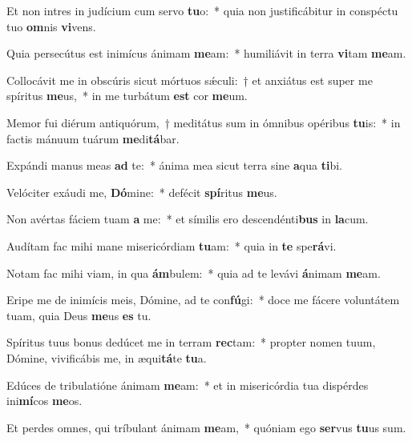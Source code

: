 \item Et non intres in judícium cum servo \textbf{tu}o:~* quia non justificábitur in conspéctu tuo \textbf{om}nis \textbf{vi}vens.
\item Quia persecútus est inimícus ánimam \textbf{me}am:~* humiliávit in terra \textbf{vi}tam \textbf{me}am.
\item Collocávit me in obscúris sicut mórtuos sǽculi:~† et anxiátus est super me spíritus \textbf{me}us,~* in me turbátum \textbf{est} cor \textbf{me}um.
\item Memor fui diérum antiquórum,~† meditátus sum in ómnibus opéribus \textbf{tu}is:~* in factis mánuum tuárum \textbf{me}di\textbf{tá}bar.
\item Expándi manus meas \textbf{ad} te:~* ánima mea sicut terra sine \textbf{a}qua \textbf{ti}bi.
\item Velóciter exáudi me, \textbf{Dó}mine:~* defécit \textbf{spí}ritus \textbf{me}us.
\item Non avértas fáciem tuam \textbf{a} me:~* et símilis ero descendénti\textbf{bus} in \textbf{la}cum.
\item Audítam fac mihi mane misericórdiam \textbf{tu}am:~* quia in \textbf{te} spe\textbf{rá}vi.
\item Notam fac mihi viam, in qua \textbf{ám}bulem:~* quia ad te levávi \textbf{á}nimam \textbf{me}am.
\item Eripe me de inimícis meis, Dómine, ad te con\textbf{fú}gi:~* doce me fácere voluntátem tuam, quia Deus \textbf{me}us \textbf{es} tu.
\item Spíritus tuus bonus dedúcet me in terram \textbf{rec}tam:~* propter nomen tuum, Dómine, vivificábis me, in æqui\textbf{tá}te \textbf{tu}a.
\item Edúces de tribulatióne ánimam \textbf{me}am:~* et in misericórdia tua dispérdes ini\textbf{mí}cos \textbf{me}os.
\item Et perdes omnes, qui tríbulant ánimam \textbf{me}am,~* quóniam ego \textbf{ser}vus \textbf{tu}us sum.
